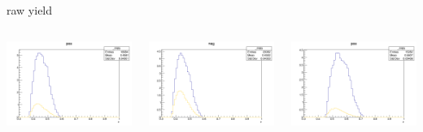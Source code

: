 \begin{frame}{raw yield}
\begin{columns}
\begin{column}[T]{0.25\textwidth}
\includegraphics[width = \textwidth]{results/yield/statistics/yield_x_Q2_z_0.60_5.500_0.45_pos.png}
\end{column}
\begin{column}[T]{0.25\textwidth}
\includegraphics[width = \textwidth]{results/yield/statistics/yield_x_Q2_z_0.60_5.500_0.45_neg.png}
\end{column}
\begin{column}[T]{0.25\textwidth}
\includegraphics[width = \textwidth]{results/yield/statistics/yield_x_Q2_z_0.60_5.500_0.55_pos.png}

\end{column}
\end{columns}
\end{frame}
